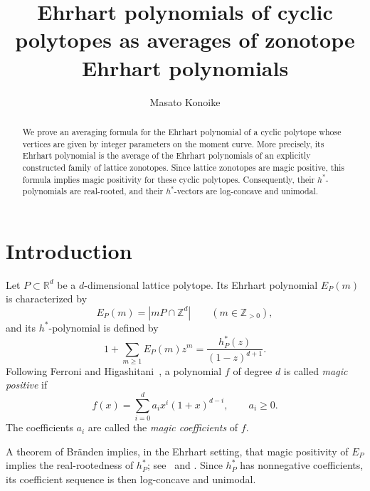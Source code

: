\documentclass[a4paper,reqno,11pt,oneside]{amsart}
\newcommand{\ZZ}{\mathbb{Z}}
\newcommand{\RR}{\mathbb{R}}
\theoremstyle{definition}
\theoremstyle{remark}
\begin{document}
\title{Ehrhart polynomials of cyclic polytopes as averages of zonotope Ehrhart polynomials}
\author{Masato Konoike}


\address{Department of Pure and Applied Mathematics, Graduate School of Information Science and Technology, The University of Osaka, Suita, Osaka 565-0871, Japan}



\begin{abstract}
We prove an averaging formula for the Ehrhart polynomial of a cyclic polytope whose vertices are given by integer parameters on the moment curve. More precisely, its Ehrhart polynomial is the average of the Ehrhart polynomials of an explicitly constructed family of lattice zonotopes. Since lattice zonotopes are magic positive, this formula implies magic positivity for these cyclic polytopes. Consequently, their $h^\ast$-polynomials are real-rooted, and their $h^\ast$-vectors are log-concave and unimodal.
\end{abstract}

\maketitle

\section{Introduction}\label{sec:introduction}

Let $P\subset\RR^d$ be a $d$-dimensional lattice polytope. Its Ehrhart polynomial $E_P(m)$ is characterized by
\[
E_P(m)=|mP\cap\ZZ^d| \qquad (m\in\ZZ_{>0}),
\]
and its $h^\ast$-polynomial is defined by
\[
1 + \sum_{m\ge1}E_P(m)z^m=\frac{h_P^\ast(z)}{(1-z)^{d+1}}.
\]
Following Ferroni and Higashitani~\cite{ferroni2024examples}, a polynomial $f$ of degree $d$ is called \emph{magic positive} if
\begin{equation}\label{eq:magic-basis} f(x)=\sum_{i=0}^d a_i x^i(1+x)^{d-i},\qquad a_i \ge 0. 
\end{equation}
The coefficients $a_i$ are called the \emph{magic coefficients} of $f$.

A theorem of Br\"anden implies, in the Ehrhart setting, that magic positivity of $E_P$ implies the real-rootedness of $h_P^\ast$; see~\cite{branden2006linear} and \cite[Theorem~4.19]{ferroni2024examples}. Since $h_P^\ast$ has nonnegative coefficients, its coefficient sequence is then log-concave and unimodal.
\end{document}
